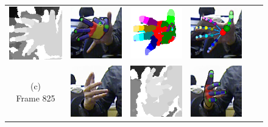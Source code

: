 \begin{figure}
\begin{tabular}{@{}cc@{}c@{}c@{}c@{}c@{}}
		\includegraphics[width=2.4cm]{fig/hand/qual/depth/image_0520.png} &
		\includegraphics[width=2.4cm]{fig/hand/qual/forth/image_0520.png} &
		\includegraphics[width=2.4cm]{fig/hand/qual/class/class-520.png} &
		\includegraphics[width=2.4cm]{fig/hand/qual/vote/image_0520.png}
		\label{fig/hand/multi2} \\
		\raisebox{1cm}{\parbox{2cm}{\centering (c)\\Frame 825}} & 
		\includegraphics[width=2.4cm]{fig/hand/qual/rgb/image_0825.png} &
		\includegraphics[width=2.4cm]{fig/hand/qual/depth/image_0825.png} &
		\includegraphics[width=2.4cm]{fig/hand/qual/forth/image_0825.png} &

\end{tabular}
\end{figure}
